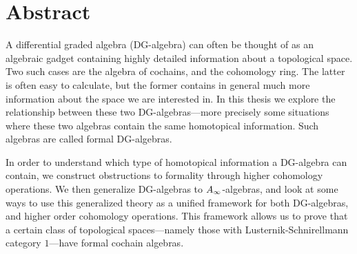 

\section{Abstract}

A differential graded algebra (DG-algebra) can often be thought of as an algebraic gadget containing highly detailed information about a topological space. Two such cases are the algebra of cochains, and the cohomology ring. The latter is often easy to calculate, but the former contains in general much more information about the space we are interested in. In this thesis we explore the relationship between these two DG-algebras---more precisely some situations where these two algebras contain the same homotopical information. Such algebras are called formal DG-algebras.

In order to understand which type of homotopical information a DG-algebra can contain, we construct obstructions to formality through higher cohomology operations. We then generalize DG-algebras to $A_{\infty}$-algebras, and look at some ways to use this generalized theory as a unified framework for both DG-algebras, and higher order cohomology operations. This framework allows us to prove that a certain class of topological spaces---namely those with Lusternik-Schnirellmann category $1$---have formal cochain algebras. 